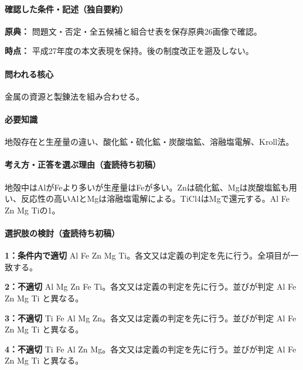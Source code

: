 \paragraph{確認した条件・記述（独自要約）}\mbox{}\par

\noindent\textbf{原典：} 問題文・否定・全五候補と組合せ表を保存原典26画像で確認。\par

\noindent\textbf{時点：} 平成27年度の本文表現を保持。後の制度改正を遡及しない。\par

\paragraph{問われる核心} 金属の資源と製錬法を組み合わせる。

\paragraph{必要知識} 地殻存在と生産量の違い、酸化鉱・硫化鉱・炭酸塩鉱、溶融塩電解、Kroll法。

\paragraph{考え方・正答を選ぶ理由（査読待ち初稿）} 地殻中はAlがFeより多いが生産量はFeが多い。Znは硫化鉱、Mgは炭酸塩鉱も用い、反応性の高いAlとMgは溶融塩電解による。TiCl4はMgで還元する。Al Fe Zn Mg Tiの1。

\paragraph{選択肢の検討（査読待ち初稿）}\mbox{}\par

\noindent\textbf{1：条件内で適切} Al Fe Zn Mg Ti。各文又は定義の判定を先に行う。全項目が一致する。\par

\noindent\textbf{2：不適切} Al Mg Zn Fe Ti。各文又は定義の判定を先に行う。並びが判定 Al Fe Zn Mg Ti と異なる。\par

\noindent\textbf{3：不適切} Ti Fe Al Mg Zn。各文又は定義の判定を先に行う。並びが判定 Al Fe Zn Mg Ti と異なる。\par

\noindent\textbf{4：不適切} Ti Fe Al Zn Mg。各文又は定義の判定を先に行う。並びが判定 Al Fe Zn Mg Ti と異なる。\par

